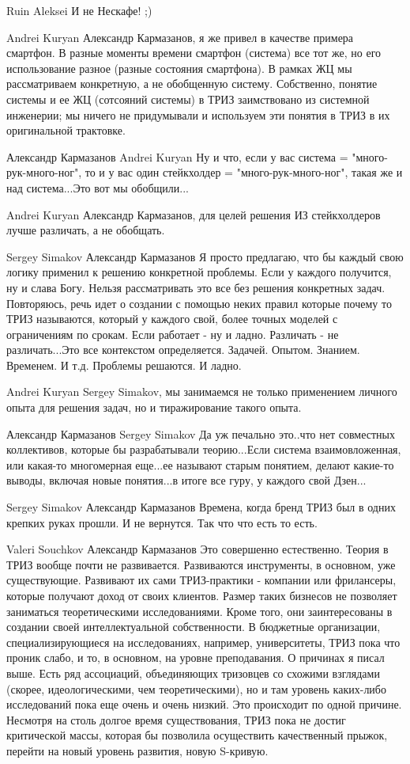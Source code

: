 \documentclass[11pt,a4paper]{article}
\begin{document}
Ruin Aleksei И не Нескафе! ;)

Andrei Kuryan Александр Кармазанов, я же привел в качестве примера смартфон. В
разные моменты времени смартфон (система) все тот же, но его использование
разное (разные состояния смартфона). В рамках ЖЦ мы рассматриваем конкретную,
а не обобщенную систему. Собственно, понятие системы и ее ЖЦ (сотсояний
системы) в ТРИЗ заимствовано из системной инженерии; мы ничего не придумывали
и используем эти понятия в ТРИЗ в их оригинальной трактовке.

Александр Кармазанов Andrei Kuryan Ну и что, если у вас система =
"много-рук-много-ног", то и у вас один стейкхолдер = "много-рук-много-ног",
такая же и над система...Это вот мы обобщили...

Andrei Kuryan Александр Кармазанов, для целей решения ИЗ стейкхолдеров лучше
различать, а не обобщать.

Sergey Simakov Александр Кармазанов Я просто предлагаю, что бы каждый свою
логику применил к решению конкретной проблемы. Если у каждого получится, ну и
слава Богу. Нельзя рассматривать это все без решения конкретных задач.
Повторяюсь, речь идет о создании с помощью неких правил которые почему то ТРИЗ
называются, который у каждого свой, более точных моделей с ограничениям по
срокам.  Если работает - ну и ладно.  Различать - не различать...Это все
контекстом определяется. Задачей. Опытом. Знанием. Временем. И т.д.  Проблемы
решаются. И ладно.

Andrei Kuryan Sergey Simakov, мы занимаемся не только применением личного
опыта для решения задач, но и тиражирование такого опыта.

Александр Кармазанов Sergey Simakov Да уж печально это..что нет совместных
коллективов, которые бы разрабатывали теорию...Если система взаимовложенная,
или какая-то многомерная еще...ее называют старым понятием, делают какие-то
выводы, включая новые понятия...в итоге все гуру, у каждого свой Дзен...

Sergey Simakov Александр Кармазанов Времена, когда бренд ТРИЗ был в одних
крепких руках прошли. И не вернутся. Так что что есть то есть.

Valeri Souchkov Александр Кармазанов Это совершенно естественно. Теория в ТРИЗ
вообще почти не развивается. Развиваются инструменты, в основном, уже
существующие. Развивают их сами ТРИЗ-практики - компании или фрилансеры,
которые получают доход от своих клиентов. Размер таких бизнесов не позволяет
заниматься теоретическими исследованиями. Кроме того, они заинтересованы в
создании своей интеллектуальной собственности. В бюджетные организации,
специализирующиеся на исследованиях, например, университеты, ТРИЗ пока что
проник слабо, и то, в основном, на уровне преподавания. О причинах я писал
выше. Есть ряд ассоциаций, объединяющих тризовцев со схожими взглядами
(скорее, идеологическими, чем теоретическими), но и там уровень каких-либо
исследований пока еще очень и очень низкий. Это происходит по одной
причине. Несмотря на столь долгое время существования, ТРИЗ пока не достиг
критической массы, которая бы позволила осуществить качественный прыжок,
перейти на новый уровень развития, новую S-кривую.
\end{document}
